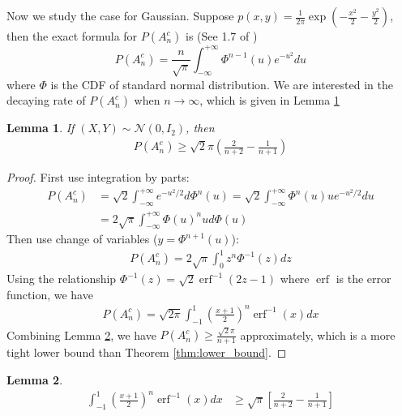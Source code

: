 \documentclass{article}
\newtheorem{lemma}{Lemma}
\DeclareMathOperator{\erf}{erf}
\begin{document}
Now we study the case for Gaussian.
Suppose $p(x,y)=\frac{1}{2\pi}\exp(-\frac{x^2}{2}
-\frac{y^2}{2})$,
then the exact formula for $P(A_n^c)$
is (See 1.7 of \cite{kabluchko2020absorption})
\begin{equation}\label{eq:gaussian_2d}
    P(A_n^c) = \frac{n}{\sqrt{\pi}} \int_{-\infty}^{+\infty}
    \Phi^{n-1}(u)e^{-u^2}du
\end{equation}
where $\Phi$ is the CDF of standard normal distribution.
We are interested in the decaying rate of $P(A_n^c)$
when $n\to \infty$, which is given in Lemma \ref{lem:gaussian}
\begin{lemma}\label{lem:gaussian}
If $(X,Y)\sim \mathcal{N}(0, I_2)$, then
\begin{align*}
P(A_n^c )\geq  \sqrt{2}\pi \left(\frac{2}{n+2}
-\frac{1}{n+1}
\right)
\end{align*}
\end{lemma}
\begin{proof}


First use integration by parts:
\begin{align*}
    P(A_n^c) &= \sqrt{2} \int_{-\infty}^{+\infty}
    e^{-u^2/2}d\Phi^n(u)
    =\sqrt{2} \int_{-\infty}^{+\infty}\Phi^n(u)
    ue^{-u^2/2}du \\
    &=2\sqrt{\pi} \int_{-\infty}^{+\infty}
    \Phi(u)^n ud\Phi(u)
\end{align*}
Then use change of variables ($y=\Phi^{n+1}(u)$):
\begin{align*}
    P(A_n^c) 
    =2\sqrt{\pi} \int_{0}^{1}z^n \Phi^{-1}(z)dz
\end{align*}
Using the relationship
$\Phi^{-1}(z)
= \sqrt{2} \erf^{-1}(2z-1)$
where $\erf$ is the error function,
we have
\begin{align*}
    P(A_n^c) 
    =\sqrt{2\pi} \int_{-1}^{1}
    \left(\frac{x+1}{2} \right)^n
    \erf^{-1} (x)dx
\end{align*}
Combining Lemma \ref{lem:bound_erf_integral},
we have $P(A_n^c) \geq  \frac{\sqrt{2}\pi}{n+1}$
approximately, which is a more tight lower bound than
Theorem \ref{thm:lower_bound}.
\end{proof}
\begin{lemma}\label{lem:bound_erf_integral}
    \begin{align}\label{eq:bound_erf_integral}
        \int_{-1}^{1}
    \left(\frac{x+1}{2} \right)^n
    \erf^{-1} (x)dx & \geq \sqrt{\pi}
    \left[\frac{2}{n+2} - \frac{1}{n+1}\right]
    \end{align}
\end{lemma}
\end{document}
